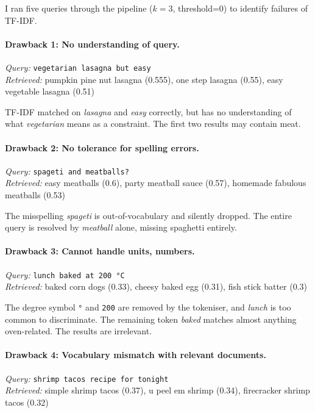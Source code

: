 \documentclass[a4paper,11pt]{article}
\begin{document}
I ran five queries through the pipeline ($k=3$, threshold=0) to identify failures of TF-IDF.
\paragraph{Drawback 1: No understanding of query.}
\textit{Query:} \texttt{vegetarian lasagna but easy} \\
\textit{Retrieved:} pumpkin pine nut lasagna (0.555), one step lasagna (0.55), easy vegetable lasagna (0.51)

TF-IDF matched on \textit{lasagna} and \textit{easy} correctly, but has no understanding of what \textit{vegetarian} means as a constraint. The first two results may contain meat.

\paragraph{Drawback 2: No tolerance for spelling errors.}
\textit{Query:} \texttt{spageti and meatballs?} \\
\textit{Retrieved:} easy meatballs (0.6), party meatball sauce (0.57), homemade fabulous meatballs (0.53)

The misspelling \textit{spageti} is out-of-vocabulary and silently dropped. The entire query is resolved by \textit{meatball} alone, missing spaghetti entirely.

\paragraph{Drawback 3: Cannot handle units, numbers.}
\textit{Query:} \texttt{lunch baked at 200 °C} \\
\textit{Retrieved:} baked corn dogs (0.33), cheesy baked egg (0.31), fish stick batter (0.3)

The degree symbol \texttt{°} and \texttt{200} are removed by the tokeniser, and \textit{lunch} is too common to discriminate. The remaining token \textit{baked} matches almost anything oven-related. The results are irrelevant.

\paragraph{Drawback 4: Vocabulary mismatch with relevant documents.}
\textit{Query:} \texttt{shrimp tacos recipe for tonight} \\
\textit{Retrieved:} simple shrimp tacos (0.37), u peel em shrimp (0.34), firecracker shrimp tacos (0.32)
\end{document}
